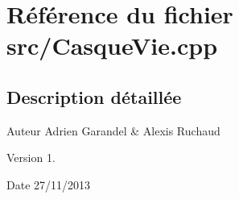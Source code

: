 \section{Référence du fichier src/\-Casque\-Vie.cpp}
\label{_casque_vie_8cpp}


\subsection{Description détaillée}
\begin{DoxyAuthor}{Auteur}
Adrien Garandel \& Alexis Ruchaud 
\end{DoxyAuthor}
\begin{DoxyVersion}{Version}
1. 
\end{DoxyVersion}
\begin{DoxyDate}{Date}
27/11/2013 
\end{DoxyDate}
